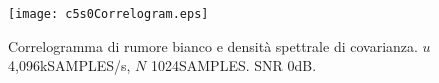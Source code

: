 \begin{figure}[tbp] 
\centering    
\texttt{[image: c5s0Correlogram.eps]}
\caption[Correlogramma di rumore bianco e densità spettrale di covarianza]
{ Correlogramma di rumore bianco e densità spettrale di covarianza. $
u$ 4,096kSAMPLES/s, $N$ 1024SAMPLES. SNR 0dB.}
\label{fig:Correlogram}
\end{figure}
